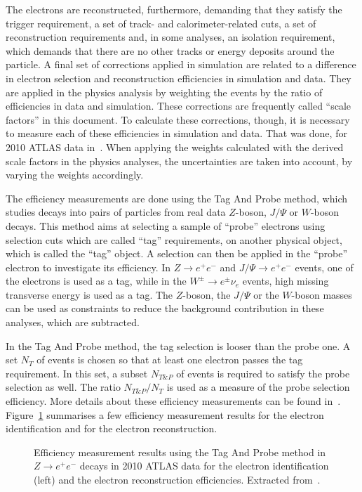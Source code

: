 The electrons are reconstructed, furthermore, demanding that they satisfy the trigger requirement, a set of track- and calorimeter-related cuts,
a set of reconstruction requirements and, in some analyses, an isolation requirement, which demands that there are no other tracks or energy deposits
around the particle.
A final set of corrections applied in simulation are related to a difference in electron selection and reconstruction efficiencies in simulation and data. They are applied in
the physics analysis by weighting the events by the ratio of efficiencies in data and simulation. These corrections are frequently called ``scale factors'' in this document.
To calculate these corrections, though, it is necessary to measure each of these efficiencies in simulation and data. That was done, for 2010 ATLAS data in~\cite{electron2010}.
When applying the weights calculated with the derived scale factors in the physics analyses,
the uncertainties are taken into account, by varying the weights accordingly.

The efficiency measurements are done using the Tag And Probe method, which studies decays into pairs of particles from real data $Z$-boson, $J/\Psi$ or $W$-boson decays.
This method aims at selecting a sample of ``probe'' electrons using selection cuts which are called ``tag'' requirements, on another physical object, which is
called the ``tag'' object. A selection can then be applied in the ``probe'' electron to investigate its efficiency. In $Z \rightarrow e^+e^-$ and $J/\Psi \rightarrow e^+e^-$
events, one
of the electrons is used as a tag, while in the $W^{\pm} \rightarrow e^{\pm} \nu_e$ events,
high missing transverse energy is used as a tag. The $Z$-boson, the $J/\Psi$ or the $W$-boson
masses can be used as constraints to reduce the background contribution in these analyses, which are subtracted.

In the Tag And Probe method, the tag selection is looser than the probe one. A set $N_T$ of events is chosen so that at least one electron passes the tag
requirement. In this set, a subset $N_{T\&P}$ of events is required to satisfy the probe selection as well. The ratio $N_{T\&P}/N_T$ is used as a measure of the probe
selection efficiency.
More details about these efficiency measurements can be found
in~\cite{electron2010}. Figure~\ref{fig:electron_eff} summarises a few efficiency measurement results for the electron identification and
for the electron reconstruction.

\begin{figure}
\centering
{}
\caption{Efficiency measurement results using the Tag And Probe method in $Z \rightarrow e^+e^-$ decays in 2010 ATLAS data for the electron identification (left) and the electron reconstruction efficiencies. Extracted from~\cite{electron2010}.}
\label{fig:electron_eff}
\end{figure}

